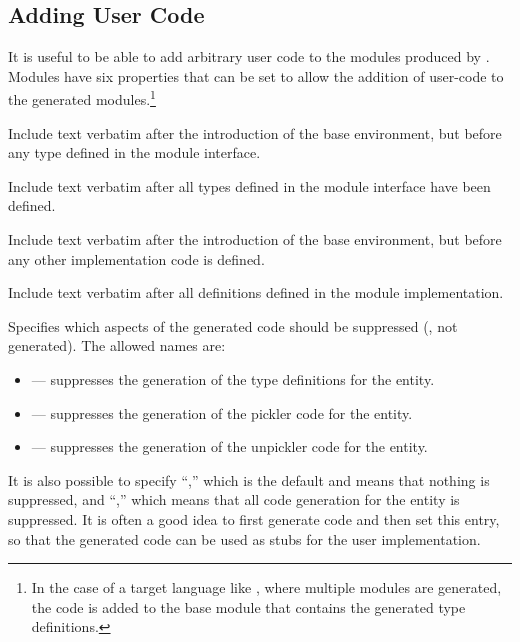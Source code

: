 \subsection{Adding User Code}
It is useful to be able to add arbitrary user code to the modules
produced by \asdlgen{}.
Modules have six properties that can be set to allow
the addition of user-code to the generated modules.\footnote{
  In the case of a target language like \sml{}, where multiple modules
  are generated, the code is added to the base module that contains the
  generated type definitions.
} 
\begin{description}
    Include text verbatim after the introduction of the base
    environment, but before any type defined in the module interface.

    Include text verbatim after all types defined in the module
    interface have been defined.
	
    Include text verbatim after the introduction of the base
    environment, but before any other implementation code is defined.
	
    Include text verbatim after all definitions defined in the module
    implementation.  


    Specifies which aspects of the generated code should be suppressed (\ie{},
    not generated).  The allowed names are:
    \begin{itemize}
      \item {} --- suppresses the generation of the type definitions for the entity.
      \item {} --- suppresses the generation of the pickler code for the entity.
      \item {} --- suppresses the generation of the unpickler code for the entity.
    \end{itemize}%
    It is also possible to specify ``,'' which is the default and means
    that nothing is suppressed, and ``,'' which means that all code generation
    for the entity is suppressed.
    It is often a good idea to first generate code and then
    set this entry, so that the generated code can be used as stubs for the 
    user implementation.


\end{description}
